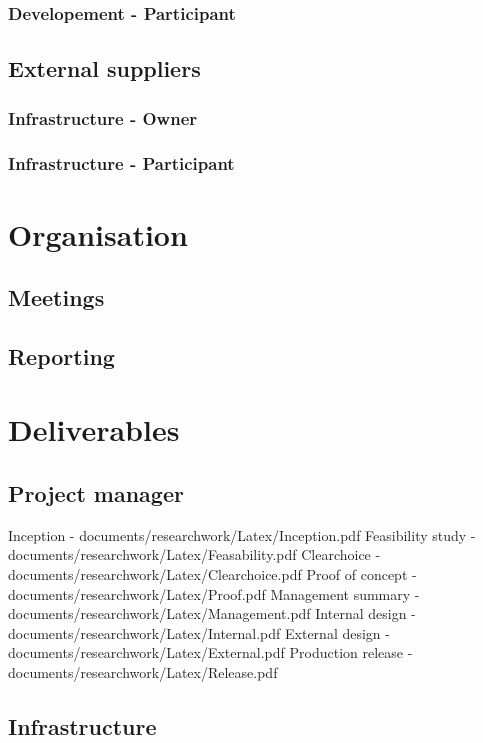 \documentclass[8pt]{article} %
\begin{document}
\subsubsection{Developement - Participant}

\subsection{External suppliers}
\subsubsection{Infrastructure - Owner}
\subsubsection{Infrastructure - Participant}

\section{Organisation}

\subsection{Meetings}
\subsection{Reporting}

\section{Deliverables}

\subsection{Project manager}
Inception - documents/researchwork/Latex/Inception.pdf
Feasibility study - documents/researchwork/Latex/Feasability.pdf
Clearchoice - documents/researchwork/Latex/Clearchoice.pdf
Proof of concept - documents/researchwork/Latex/Proof.pdf
Management summary - documents/researchwork/Latex/Management.pdf
Internal design - documents/researchwork/Latex/Internal.pdf
External design - documents/researchwork/Latex/External.pdf
Production release -documents/researchwork/Latex/Release.pdf

\subsection{Infrastructure}
\end{document}
